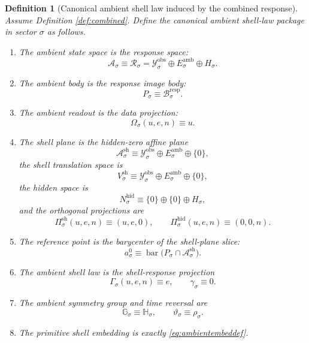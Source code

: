 \documentclass[11pt]{article}
\newcommand{\DataSpace}[1]{\mathcal Y_{#1}^{\mathrm{obs}}}
\newcommand{\AmbientSpace}[1]{\mathcal A_{#1}}
\newcommand{\AmbientBody}[1]{P_{#1}}
\newcommand{\AmbientRead}[1]{\Omega_{#1}}
\newcommand{\AmbientShellLaw}[1]{\Gamma_{#1}}
\newcommand{\AmbientValue}[1]{\gamma_{#1}}
\newcommand{\AmbientSym}[1]{\mathbb G_{#1}}
\newcommand{\AmbientTime}[1]{\vartheta_{#1}}
\newcommand{\ShellAffine}[1]{\mathcal A_{#1}^{\mathrm{sh}}}
\newcommand{\ShellVector}[1]{V_{#1}^{\mathrm{sh}}}
\newcommand{\HiddenSpace}[1]{N_{#1}^{\mathrm{hid}}}
\newcommand{\ShellProj}[1]{\Pi_{#1}^{\mathrm{sh}}}
\newcommand{\HiddenProj}[1]{\Pi_{#1}^{\mathrm{hid}}}
\newcommand{\AmbientRef}[1]{a_{#1}^{0}}
\newcommand{\AmbientTarget}[1]{E_{#1}^{\mathrm{amb}}}
\newcommand{\ResponseSpace}[1]{\mathcal R_{#1}}
\newcommand{\ResponseImage}[1]{\mathcal B_{#1}^{\mathrm{resp}}}
\newcommand{\GapSpace}[1]{H_{#1}}
\newcommand{\ResponseSym}[1]{\mathbb H_{#1}}
\newcommand{\ResponseTime}[1]{\rho_{#1}}
\newtheorem{definition}{Definition}
\begin{document}
\begin{definition}[Canonical ambient shell law induced by the combined response]
\label{def:canonical}
Assume Definition \ref{def:combined}. Define the canonical ambient shell-law package in sector \(\sigma\) as follows.
\begin{enumerate}
    \item The ambient state space is the response space:
    \[
    \AmbientSpace{\sigma}
    \equiv
    \ResponseSpace{\sigma}
    =
    \DataSpace{\sigma}\oplus \AmbientTarget{\sigma}\oplus \GapSpace{\sigma}.
    \]
    \item The ambient body is the response image body:
    \[
    \AmbientBody{\sigma}
    \equiv
    \ResponseImage{\sigma}.
    \]
    \item The ambient readout is the data projection:
    \begin{equation}
    \AmbientRead{\sigma}(u,e,n)\equiv u.
    \label{eq:ambientreaddef}
    \end{equation}
    \item The shell plane is the hidden-zero affine plane
    \begin{equation}
    \ShellAffine{\sigma}
    \equiv
    \DataSpace{\sigma}\oplus \AmbientTarget{\sigma}\oplus\{0\},
    \label{eq:shellplanedef}
    \end{equation}
    the shell translation space is
    \[
    \ShellVector{\sigma}
    \equiv
    \DataSpace{\sigma}\oplus \AmbientTarget{\sigma}\oplus\{0\},
    \]
    the hidden space is
    \[
    \HiddenSpace{\sigma}
    \equiv
    \{0\}\oplus\{0\}\oplus \GapSpace{\sigma},
    \]
    and the orthogonal projections are
    \begin{equation}
    \ShellProj{\sigma}(u,e,n)\equiv (u,e,0),
    \qquad
    \HiddenProj{\sigma}(u,e,n)\equiv (0,0,n).
    \label{eq:projectiondefs}
    \end{equation}
    \item The reference point is the barycenter of the shell-plane slice:
    \begin{equation}
    \AmbientRef{\sigma}
    \equiv
    \operatorname{bar}
    \bigl(
    \AmbientBody{\sigma}\cap \ShellAffine{\sigma}
    \bigr).
    \label{eq:refdef}
    \end{equation}
    \item The ambient shell law is the shell-response projection
    \begin{equation}
    \AmbientShellLaw{\sigma}(u,e,n)\equiv e,
    \qquad
    \AmbientValue{\sigma}\equiv 0.
    \label{eq:shelllawdef}
    \end{equation}
    \item The ambient symmetry group and time reversal are
    \[
    \AmbientSym{\sigma}\equiv \ResponseSym{\sigma},
    \qquad
    \AmbientTime{\sigma}\equiv \ResponseTime{\sigma}.
    \]
    \item The primitive shell embedding is exactly \eqref{eq:ambientembeddef}.
\end{enumerate}
\end{definition}
\end{document}
